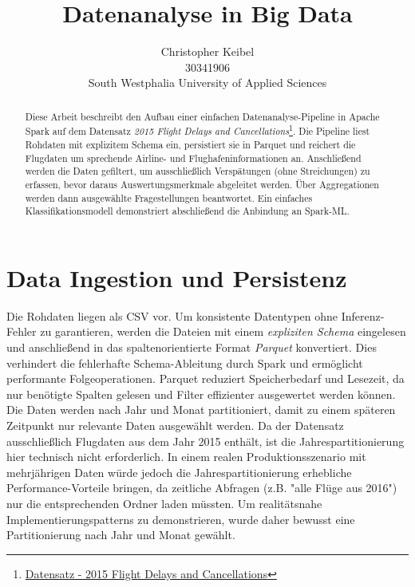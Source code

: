 \documentclass[a4paper,11pt]{article}
\title{Datenanalyse in Big Data}
\author{Christopher Keibel \\ 30341906 \\South Westphalia University of Applied Sciences}
\begin{document}
\maketitle

\begin{abstract}
Diese Arbeit beschreibt den Aufbau einer einfachen Datenanalyse-Pipeline in Apache Spark auf dem Datensatz \emph{2015 Flight Delays and Cancellations}\footnote{\href{https://www.kaggle.com/datasets/usdot/flight-delays?resource=download&select=flights.csv}{Datensatz - 2015 Flight Delays and Cancellations}}. Die Pipeline liest Rohdaten mit explizitem Schema ein, persistiert sie in Parquet und reichert die Flugdaten um sprechende Airline- und Flughafeninformationen an. Anschließend werden die Daten gefiltert, um ausschließlich Verspätungen (ohne Streichungen) zu erfassen, bevor daraus Auswertungsmerkmale abgeleitet werden. Über Aggregationen werden dann ausgewählte Fragestellungen beantwortet. Ein einfaches Klassifikationsmodell demonstriert abschließend die Anbindung an Spark-ML.

\end{abstract}

\section{Data Ingestion und Persistenz}

Die Rohdaten liegen als CSV vor. Um konsistente Datentypen ohne Inferenz-Fehler zu garantieren, werden die Dateien mit einem \emph{expliziten Schema} eingelesen und anschließend in das spaltenorientierte Format \emph{Parquet} konvertiert. Dies verhindert die fehlerhafte Schema-Ableitung durch Spark und ermöglicht performante Folgeoperationen. Parquet reduziert Speicherbedarf und Lesezeit, da nur benötigte Spalten gelesen und Filter effizienter ausgewertet werden können. Die Daten werden nach Jahr und Monat partitioniert, damit zu einem späteren Zeitpunkt nur relevante Daten ausgewählt werden. Da der Datensatz ausschließlich Flugdaten aus dem Jahr 2015 enthält, ist die Jahrespartitionierung hier technisch nicht erforderlich. In einem realen Produktionsszenario mit mehrjährigen Daten würde jedoch die Jahrespartitionierung erhebliche Performance-Vorteile bringen, da zeitliche Abfragen (z.B. "alle Flüge aus 2016") nur die entsprechenden Ordner laden müssten. Um realitätsnahe Implementierungspatterns zu demonstrieren, wurde daher bewusst eine Partitionierung nach Jahr und Monat gewählt.
\end{document}
